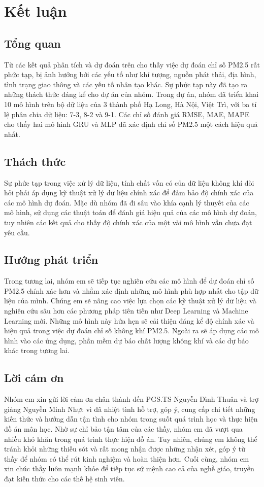 \section{Kết luận}
\subsection{Tổng quan}
Từ các kết quả phân tích và dự đoán trên cho thấy việc dự đoán chỉ số PM2.5 rất phức tạp, bị ảnh hưởng bởi các yếu tố như khí tượng, nguồn phát thải, địa hình, tình trạng giao thông và các yếu tố nhân tạo khác. Sự phức tạp này đã tạo ra những thách thức đáng kể cho dự án của nhóm. Trong dự án, nhóm đã triển khai 10 mô hình trên bộ dữ liệu của 3 thành phố Hạ Long, Hà Nội, Việt Trì, với ba tỉ lệ phân chia dữ liệu: 7-3, 8-2 và 9-1. Các chỉ số đánh giá RMSE, MAE, MAPE cho thấy hai mô hình GRU và MLP đã xác định chỉ số PM2.5 một cách hiệu quả nhất.

\subsection{Thách thức}

Sự phức tạp trong việc xử lý dữ liệu, tính chất vốn có của dữ liệu không khí đòi hỏi phải áp dụng kỹ thuật xử lý dữ liệu chính xác để đảm bảo độ chính xác của các mô hình dự đoán. Mặc dù nhóm đã đi sâu vào khía cạnh lý thuyết của các mô hình, sử dụng các thuật toán để đánh giá hiệu quả của các mô hình dự đoán, tuy nhiên các kết quả cho thấy độ chính xác của một vài mô hình vẫn chưa đạt yêu cầu.

\subsection{Hướng phát triển}

Trong tương lai, nhóm em sẽ tiếp tục nghiên cứu các mô hình để dự đoán chỉ số PM2.5 chính xác hơn và nhằm xác định những mô hình phù hợp nhất cho tập dữ liệu của mình. Chúng em sẽ nâng cao việc lựa chọn các kỹ thuật xử lý dữ liệu và nghiên cứu sâu hơn các phương pháp tiên tiến như Deep Learning và Machine Learning mới. Những mô hình này hứa hẹn sẽ cải thiện đáng kể độ chính xác và hiệu quả trong việc dự đoán chỉ số không khí PM2.5. Ngoài ra sẽ áp dụng các mô hình vào các ứng dụng, phần mềm dự báo chất lượng không khí và các dự báo khác trong tương lai.

\subsection{Lời cám ơn}

Nhóm em xin gửi lời cảm ơn chân thành đến PGS.TS Nguyễn Đình Thuân và trợ giảng Nguyễn Minh Nhựt vì đã nhiệt tình hỗ trợ, góp ý, cung cấp chi tiết những kiến thức và hướng dẫn tận tình cho nhóm trong suốt quá trình học và thực hiện đồ án môn học. Nhờ sự chỉ bảo tận tâm của các thầy, nhóm em đã vượt qua nhiều khó khăn trong quá trình thực hiện đồ án. Tuy nhiên, chúng em không thể tránh khỏi những thiếu sót và rất mong nhận được những nhận xét, góp ý từ thầy để nhóm có thể rút kinh nghiệm và hoàn thiện hơn. Cuối cùng, nhóm em xin chúc thầy luôn mạnh khỏe để tiếp tục sứ mệnh cao cả của nghề giáo, truyền đạt kiến thức cho các thế hệ sinh viên.
